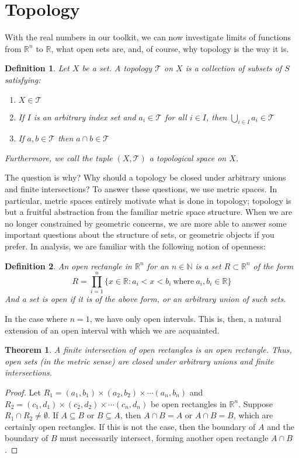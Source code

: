 \documentclass{article}
\newtheorem{thm}{Theorem}[section]
\newtheorem{defn}{Definition}[section]
\numberwithin{equation}{section}
\begin{document}
    \section{Topology}
    With the real numbers in our toolkit, we can now investigate limits of functions from $\mathbb{R}^{n}$ to $\mathbb{R}$, what open sets are,
    and, of course, why topology is the way it is.
    \begin{defn}
        Let $X$ be a set. A topology $\mathcal{T}$ on $X$ is a collection of subsets of $S$ satisfying:
        \begin{enumerate}
            \item $X \in \mathcal{T}$
            \item If $I$ is an arbitrary index set and $a_i \in \mathcal{T}$ for all $i \in I$, then $\bigcup \limits_{i \in I}a_i \in \mathcal{T}$
            \item If $a,b \in \mathcal{T}$ then $a \cap b \in \mathcal{T}$
        \end{enumerate}
        Furthermore, we call the tuple $(X,\mathcal{T})$ a topological space on $X$.
    \end{defn}
    The question is why? Why should a topology be closed under arbitrary unions and finite intersections?
    To answer these questions, we use metric spaces. In particular, metric spaces entirely motivate
    what is done in topology; topology is but a fruitful abstraction from the familiar metric space structure. When we are no longer constrained by 
    geometric concerns, we are more able to answer some important questions about 
    the structure of sets, or geometric objects if you prefer.
    In analysis, we are familiar with the following notion of openness:
    \begin{defn}
        An open rectangle in $\mathbb{R}^{n}$ for an $n \in \mathbb{N}$ is a set $R \subset \mathbb{R}^{n}$ of the form
        $$R=\prod\limits_{i=1}^{n} \{x \in \mathbb{R}: a_i<x<b_i \ \mathrm{where} \ a_i,b_i \in \mathbb{R} \} $$
        And a set is open if it is of the above form, or an arbitrary union of such sets.
    \end{defn}
    In the case where $n=1$, we have only open intervals. This is, then, a natural extension
    of an open interval with which we are acquainted.
    \begin{thm}
        A finite intersection of open rectangles is an open rectangle. Thus, open sets (in the metric sense) are closed under arbitrary unions and finite intersections.
    \end{thm}
    \begin{proof}
        Let $R_1=(a_1, b_1) \times (a_2, b_2) \times \cdots (a_n, b_n)$ and $R_2=(c_1,d_1) \times (c_2, d_2) \times \cdots (c_n, d_n)$ be open rectangles in $\mathbb{R}^{n}$. Suppose $R_1 \cap R_2 \neq \emptyset$. If $A \subseteq B$ or $B \subseteq A$, then $A \cap B=A$ or $A \cap B=B$, which are certainly open rectangles. If this is not the case, then
        the boundary of $A$ and the boundary of $B$ must necessarily intersect, forming another open rectangle $A \cap B$.
    \end{proof}
\end{document}
